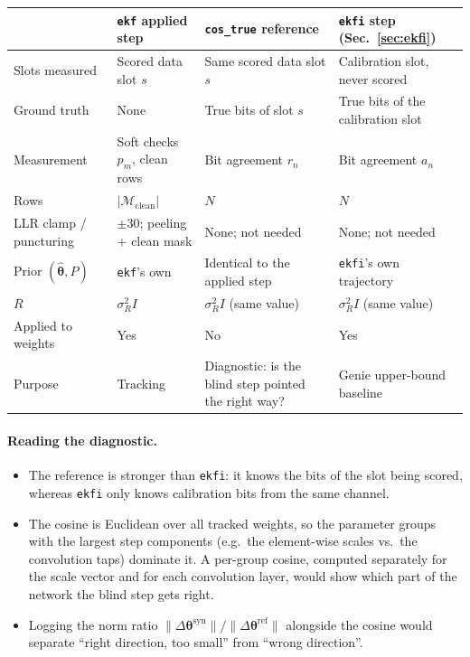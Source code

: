 \documentclass{article}
\newcommand{\state}{\boldsymbol{\theta}}
\begin{document}
{\small
\renewcommand{\arraystretch}{1.25}
\begin{tabularx}{\textwidth}{|>{\raggedright\arraybackslash}p{3.2cm}
  |>{\raggedright\arraybackslash}X|>{\raggedright\arraybackslash}X|>{\raggedright\arraybackslash}X|}
\hline
 & \texttt{ekf} applied step & \texttt{cos\_true} reference & \texttt{ekfi} step (Sec.~\ref{sec:ekfi}) \\
\hline
Slots measured & Scored data slot $s$ & Same scored data slot $s$ & Calibration slot, never scored \\
\hline
Ground truth & None & True bits of slot $s$ & True bits of the calibration slot \\
\hline
Measurement & Soft checks $p_m$, clean rows & Bit agreement $r_n$ & Bit agreement $a_n$ \\
\hline
Rows & $|\mathcal{M}_{\text{clean}}|$ & $N$ & $N$ \\
\hline
LLR clamp / puncturing & $\pm30$; peeling + clean mask & None; not needed & None; not needed \\
\hline
Prior $(\hat{\state}, P)$ & \texttt{ekf}'s own & Identical to the applied step & \texttt{ekfi}'s own trajectory \\
\hline
$R$ & $\sigma_R^2 I$ & $\sigma_R^2 I$ (same value) & $\sigma_R^2 I$ (same value) \\
\hline
Applied to weights & Yes & No & Yes \\
\hline
Purpose & Tracking & Diagnostic: is the blind step pointed the right way? & Genie upper-bound baseline \\
\hline
\end{tabularx}
}

\paragraph{Reading the diagnostic.}
\begin{itemize}[itemsep=2pt]
  \item The reference is stronger than \texttt{ekfi}: it knows the bits of the slot being scored,
  whereas \texttt{ekfi} only knows calibration bits from the same channel.
  \item The cosine is Euclidean over all tracked weights, so the parameter groups with the
  largest step components (e.g.\ the element-wise scales vs.\ the convolution taps) dominate it.
  A per-group cosine, computed separately for the scale vector and for each convolution layer,
  would show which part of the network the blind step gets right.
  \item Logging the norm ratio $\|\Delta\state^{\text{syn}}\|/\|\Delta\state^{\text{ref}}\|$
  alongside the cosine would separate ``right direction, too small'' from ``wrong direction''.
\end{itemize}
\end{document}
